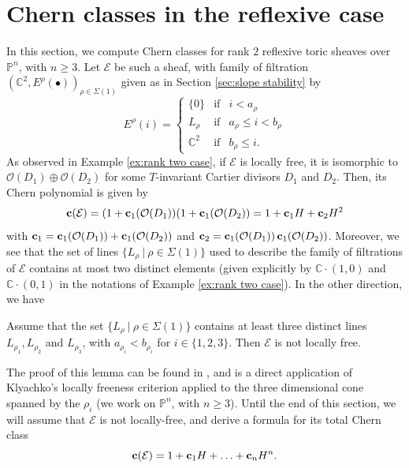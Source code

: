 \documentclass[a4paper,10pt]{amsart}
\theoremstyle{plain}{
    \newtheorem{theorem}{Theorem}[section]
    \newtheorem{lemma}[theorem]{Lemma}
    \newtheorem{corollary}[theorem]{Corollary}
    \newtheorem{proposition}[theorem]{Proposition}
    \newtheorem{conjecture}[theorem]{Conjecture}
}
\theoremstyle{definition}{
    \newtheorem{definition}[theorem]{Definition}
    \newtheorem{defn-thm}[theorem]{Definition-Theorem}
    \newtheorem{example}[theorem]{Example}
    \newtheorem{notation}[theorem]{Notation}
}
\theoremstyle{remark}{
    \newtheorem{remark}[theorem]{Remark}
    \newtheorem{problem}[theorem]{Problem}
    \newtheorem{question}[theorem]{Question}
}
\def\uc{{\bf c}}
\def\cE{\mathcal{E}}
\def\cO{\mathcal{O}}
\def\P{\mathbb{P}}
\def\C{\mathbb{C}}
\begin{document}
\section{Chern classes in the reflexive case}
\label{sec:chernclasses}
In this section, we compute Chern classes for rank $2$ reflexive toric  sheaves over $\P^n$, with $n\geq 3$. Let $\cE$ be such a sheaf, with family of filtration $(\C^2,E^\rho(\bullet))_{\rho\in\Sigma(1)}$ given as in Section \ref{sec:slope stability} by
 \begin{equation}
  \label{eq:family filtrations E}
 E^\rho(i)=\left\{
 \begin{array}{ccc}
                  \lbrace 0 \rbrace & \mathrm{ if } & i< a_\rho \\
                 L_\rho & \mathrm{ if } & a_\rho\leq i< b_\rho \\
\C^2 & \mathrm{ if } & b_\rho\leq i .
                  \end{array}
                  \right.
 \end{equation}
As observed in Example \ref{ex:rank two case},
if $\cE$ is locally free, it is isomorphic to $\cO(D_1)\oplus\cO(D_2)$ for some $T$-invariant Cartier divisors $D_1$ and $D_2$. Then, its Chern polynomial is given by 
$$
\uc(\cE)=(1+\uc_1(\cO(D_1))(1+\uc_1(\cO(D_2))=1+\uc_1 H+\uc_2 H^2
$$
with $\uc_1=\uc_1(\cO(D_1))+\uc_1(\cO(D_2))$ and $\uc_2=\uc_1(\cO(D_1))\,\uc_1(\cO(D_2))$.
Moreover, we see that the set of lines $\lbrace L_\rho\:\vert\: \rho\in\Sigma(1)\rbrace$ used to describe the family of filtrations of $\cE$ contains at most two distinct elements (given explicitly by $\C\cdot(1,0)$ and $\C\cdot(0,1)$ in the notations of Example \ref{ex:rank two case}). In the other direction, we have
\begin{lemma}
 \label{lem:singular three xrhos}
 Assume that the set $\lbrace L_\rho\:\vert\: \rho\in\Sigma(1)\rbrace$  contains at least three distinct lines $L_{\rho_1}, L_{\rho_2}$ and $L_{\rho_3}$, with $a_{\rho_i}<b_{\rho_i}$ for $i\in\lbrace 1,2,3\rbrace$. Then $\cE$ is not locally free.
\end{lemma}
The proof of this lemma can be found in \cite[Proof of Proposition 4]{TipTrGr}, and is a direct application of Klyachko's locally freeness criterion applied to the three dimensional cone spanned by the $\rho_i$ (we work on $\P^n$, with $n\geq 3$). Until the end of this section, we will assume that $\cE$ is not locally-free, and derive a formula for its total Chern class
$$
\uc(\cE)=1+\uc_1H+\ldots+\uc_n H^n.
$$
\end{document}
